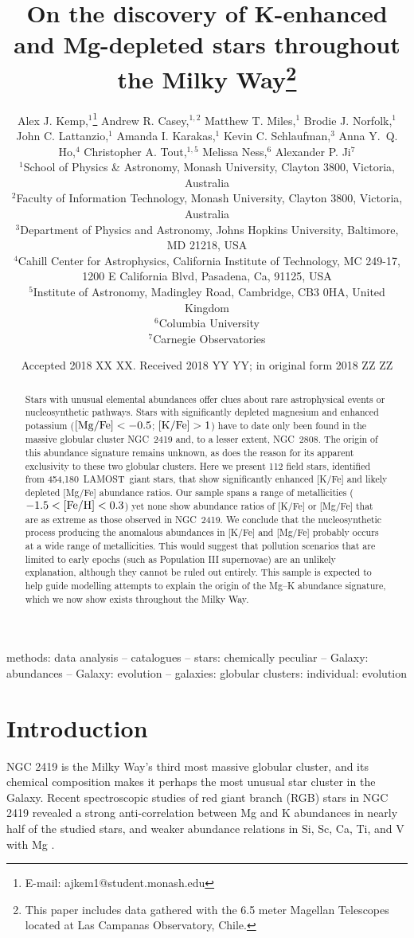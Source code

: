 \documentclass[a4paper,fleqn,usenatbib]{mnras}
\title[Mg--K stars in LAMOST]{On the discovery of K-enhanced and Mg-depleted stars throughout the Milky Way\footnote{This paper includes data gathered with the 6.5 meter Magellan Telescopes located at Las Campanas Observatory, Chile.}}
\author[Kemp et al.]{Alex J. Kemp,$^{1}$\thanks{E-mail: ajkem1@student.monash.edu}
Andrew R. Casey,$^{1,2}$
Matthew T. Miles,$^{1}$
Brodie J. Norfolk,$^{1}$\newauthor
John C. Lattanzio,$^{1}$
Amanda I. Karakas,$^{1}$
Kevin C. Schlaufman,$^{3}$
Anna Y.~Q. Ho,$^{4}$\newauthor
Christopher A. Tout,$^{1,5}$
Melissa Ness,$^{6}$
Alexander P. Ji$^{7}$
\\
$^{1}$School of Physics \& Astronomy, Monash University, Clayton 3800, Victoria, Australia\\
$^{2}$Faculty of Information Technology, Monash University, Clayton 3800, Victoria, Australia\\
$^{3}$Department of Physics and Astronomy, Johns Hopkins University, Baltimore, MD 21218, USA\\
$^{4}$Cahill Center for Astrophysics, California Institute of Technology, MC 249-17, 1200 E California Blvd, Pasadena, Ca, 91125, USA\\
$^{5}$Institute of Astronomy, Madingley Road, Cambridge, CB3 0HA, United Kingdom\\
$^{6}$Columbia University\\
$^{7}$Carnegie Observatories
}
\date{Accepted 2018 XX XX. Received 2018 YY YY; in original form 2018 ZZ ZZ}
\newcommand{\LamostGiants}{454,180}
\newcommand{\project}[1]{#1}
\newcommand{\lamost}{\project{LAMOST}}
\let\ACMmaketitle=\maketitle
\renewcommand{\maketitle}{\begingroup\let\footnote=\thanks \ACMmaketitle\endgroup}
\begin{document}
\label{firstpage}
\pagerange{\pageref{firstpage}--\pageref{lastpage}}
\maketitle


\begin{abstract}
Stars with unusual elemental abundances offer clues about rare astrophysical events or nucleosynthetic pathways. Stars with significantly depleted magnesium and enhanced potassium ($[{\rm Mg}/{\rm Fe}] < -0.5$; $[{\rm K}/{\rm Fe}] > 1$) have to date only been found in the massive globular cluster NGC~2419 and, to a lesser extent, NGC~2808. The origin of this abundance signature remains unknown, as does the reason for its apparent exclusivity to these two globular clusters. Here we present
112 field stars, identified from \LamostGiants\ \lamost\ giant stars, that show significantly enhanced [K/Fe] and likely depleted [Mg/Fe] abundance ratios.
Our sample spans a range of metallicities ($-1.5 < [{\rm Fe}/{\rm H}] < 0.3$) yet none show abundance ratios of [K/Fe] or [Mg/Fe] that are as extreme as those observed in NGC~2419. 
We conclude that the nucleosynthetic process producing the anomalous abundances in [K/Fe] and [Mg/Fe] probably occurs at a wide range of metallicities. This would suggest that pollution scenarios that are limited to early epochs (such as Population III supernovae) are an unlikely explanation, although they cannot be ruled out entirely. This sample is expected to help guide modelling  attempts to explain the origin of the Mg--K abundance signature, which we now show exists throughout the Milky Way.
\end{abstract}

\begin{keywords}
methods: data analysis -- catalogues -- stars: chemically peculiar -- Galaxy: abundances -- Galaxy: evolution -- galaxies: globular clusters: individual: evolution
\end{keywords}



\section{Introduction}
\label{sec:intro}
NGC 2419 is the Milky Way's third most massive globular cluster, and its chemical composition makes it perhaps the most unusual star cluster in the Galaxy. Recent spectroscopic studies of red giant branch (RGB) stars in NGC 2419 revealed a strong anti-correlation between Mg and K abundances in nearly half of the studied stars, and weaker abundance relations in Si, Sc, Ca, Ti, and V with Mg \citep{mucciarelli2012,cohenkirby2012}.
\end{document}
